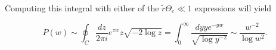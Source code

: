 \documentclass[10pt]{revtex4}
\begin{document}
Computing this integral with either of the $\tilde{r}\Theta_c \ll 1$ expressions will yield

\begin{equation}
P(w) \sim \oint_C \frac{dz}{2\pi i}e^{zw}z \sqrt{-2 \log z} = \int^\infty_0 \frac{dy y e^{-yw}}{\sqrt{\log y^{-2}}} \sim \frac{w^{-2}}{\log w^2}.
\end{equation}

%
%
%
%
\end{document}
